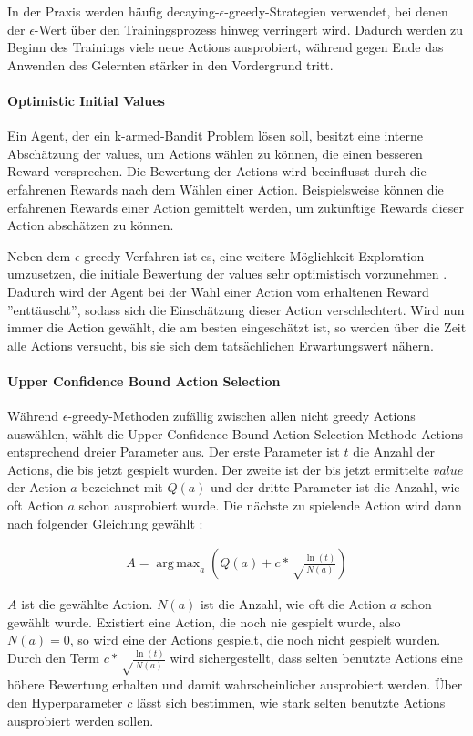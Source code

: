 \documentclass[11pt]{scrartcl}
\DeclareMathOperator*{\argmax}{arg\,max}
\begin{document}
In der Praxis werden häufig decaying-$\epsilon$-greedy-Strategien verwendet, bei denen der
$\epsilon$-Wert über den Trainingsprozess hinweg verringert wird. Dadurch werden zu Beginn
des Trainings viele neue Actions ausprobiert, während gegen Ende das Anwenden des
Gelernten stärker in den Vordergrund tritt.

\paragraph{Optimistic Initial Values}
Ein Agent, der ein k-armed-Bandit Problem lösen soll, besitzt eine interne Abschätzung der
values, um Actions wählen zu können, die einen besseren Reward versprechen. Die
Bewertung der Actions wird beeinflusst durch die erfahrenen Rewards nach dem Wählen einer
Action. Beispielsweise können die erfahrenen Rewards einer Action gemittelt werden, um
zukünftige Rewards dieser Action abschätzen zu können.

Neben dem $\epsilon$-greedy Verfahren ist es, eine weitere Möglichkeit Exploration umzusetzen,
die initiale Bewertung der values sehr optimistisch vorzunehmen \cite[~S.26]{SB1998}.
Dadurch wird der Agent bei der Wahl einer Action vom erhaltenen Reward ''enttäuscht'',
sodass sich die Einschätzung dieser Action verschlechtert. Wird nun immer die Action
gewählt, die am besten eingeschätzt ist, so werden über die Zeit alle Actions versucht,
bis sie sich dem tatsächlichen Erwartungswert nähern.

\paragraph{Upper Confidence Bound Action Selection}
Während $\epsilon$-greedy-Methoden zufällig zwischen allen nicht greedy Actions
auswählen, wählt die Upper Confidence Bound Ac\-tion Selection Methode Actions entsprechend
dreier Parameter aus.
Der erste Parameter ist $t$ die Anzahl der Actions, die bis jetzt gespielt wurden. Der
zweite ist der bis jetzt ermittelte $value$ der Action $a$ bezeichnet mit $Q(a)$ und der
dritte Parameter ist die Anzahl, wie oft Action $a$ schon ausprobiert wurde. Die nächste
zu spielende Action wird dann nach folgender Gleichung gewählt \cite[~S.27]{SB1998}:

\begin{align}
  A = \argmax_a\left( Q(a) + c*\sqrt\frac{\ln(t)}{N(a)} \right)
\end{align}

$A$ ist die gewählte Action. $N(a)$ ist die Anzahl, wie oft die Action $a$ schon gewählt
wurde. Existiert eine Action, die noch nie gespielt wurde, also $N(a)=0$, so wird eine der
Actions gespielt, die noch nicht gespielt wurden. Durch den Term
$c*\sqrt\frac{\ln(t)}{N(a)}$ wird sichergestellt, dass selten benutzte Actions eine höhere
Bewertung erhalten und damit wahrscheinlicher ausprobiert werden. Über den Hyperparameter
$c$ lässt sich bestimmen, wie stark selten benutzte Actions ausprobiert werden sollen.
\end{document}
